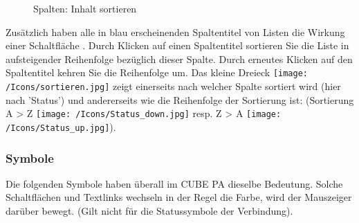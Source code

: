 \begin{figure}[H]
\caption{Spalten: Inhalt sortieren}
\end{figure}


Zusätzlich haben alle in blau erscheinenden Spaltentitel von Listen die Wirkung einer Schaltfläche . Durch Klicken auf einen Spaltentitel sortieren Sie die
Liste in aufsteigender Reihenfolge bezüglich dieser Spalte. Durch erneutes Klicken auf den Spaltentitel kehren Sie die Reihenfolge um. Das kleine Dreieck \texttt{[image: /Icons/sortieren.jpg]}  zeigt einerseits nach welcher Spalte sortiert wird (hier nach 'Status') und andererseits wie die Reihenfolge der Sortierung ist: (Sortierung A {\textgreater} Z \texttt{[image: /Icons/Status\_down.jpg]} resp. Z {\textgreater} A \texttt{[image: /Icons/Status\_up.jpg]}).

\pagebreak
\subsubsection{Symbole}
\label{bkm:Ref443039356}
Die folgenden Symbole haben überall im CUBE PA dieselbe Bedeutung. Solche Schaltflächen und Textlinks wechseln in der Regel die Farbe, wird der Mauszeiger darüber bewegt. (Gilt nicht für die Statussymbole der Verbindung). 

